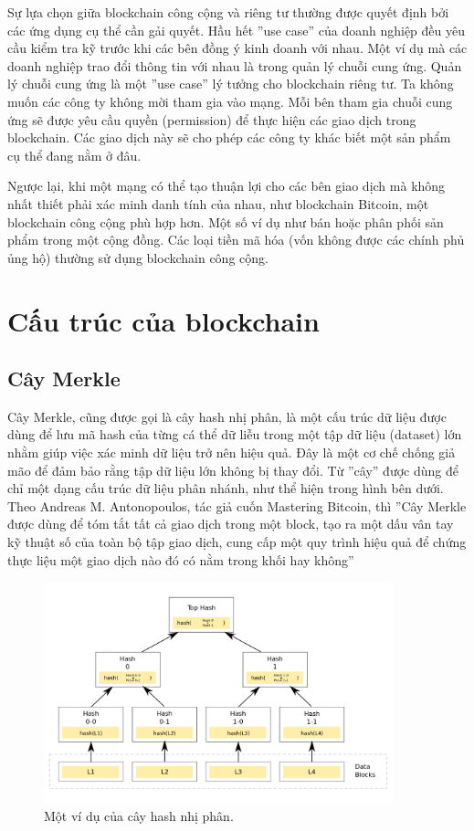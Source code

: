 \documentclass[12pt,a4paper]{article}
\begin{document}
Sự lựa chọn giữa blockchain công cộng và riêng tư thường được quyết định bởi các ứng dụng cụ thể cần gải quyết. Hầu hết ''use case'' của doanh nghiệp đều yêu cầu kiểm tra kỹ trước khi các bên đồng ý kinh doanh với nhau. Một ví dụ mà các doanh nghiệp trao đổi thông tin với nhau là trong quản lý chuỗi cung ứng. Quản lý chuỗi cung ứng là một ''use case''  lý tưởng cho blockchain riêng tư. Ta không muốn các công ty không mời tham gia vào mạng. Mỗi bên tham gia chuỗi cung ứng sẽ được yêu cầu quyền (permission) để thực hiện các giao dịch trong blockchain. Các giao dịch này sẽ cho phép các công ty khác biết một sản phẩm cụ thể đang nằm ở đâu.

 Ngược lại, khi một mạng có thể tạo thuận lợi cho các bên giao dịch mà không nhất thiết phải xác minh danh tính của nhau, như blockchain Bitcoin, một blockchain công cộng phù hợp hơn. Một số ví dụ như bán hoặc phân phối sản phẩm trong một cộng đồng. Các loại tiền mã hóa (vốn không được các chính phủ ủng hộ) thường sử dụng blockchain công cộng. 
 
 \section{Cấu trúc của blockchain}
 \subsection{Cây Merkle}
 
 Cây Merkle, cũng được gọi là cây hash nhị phân, là một cấu trúc dữ liệu được dùng để lưu mã hash của từng cá thể dữ liễu  trong một tập dữ liệu (dataset) lớn nhằm giúp việc xác minh dữ liệu trở nên hiệu quả. Đây là một cơ chế chống giả mão để đảm bảo rằng tập dữ liệu lớn không bị thay đổi. Từ ''cây'' được dùng để chỉ một dạng cấu trúc dữ liệu phân nhánh, như thể hiện trong hình bên dưới. Theo Andreas M. Antonopoulos, tác giả cuốn Mastering Bitcoin, thì ''Cây Merkle được dùng để tóm tắt tất cả giao dịch trong một block, tạo ra một dấu vân tay kỹ thuật số của toàn bộ tập giao dịch, cung cấp một quy trình hiệu quả để chứng thực liệu một giao dịch nào đó có nằm trong khối hay không''
 \begin{figure}[h]
 	\centering
 	\includegraphics[width=0.9\textwidth]{Hash_Tree}
 	\caption{Một ví dụ của cây hash nhị phân.}
 \end{figure}
\end{document}
